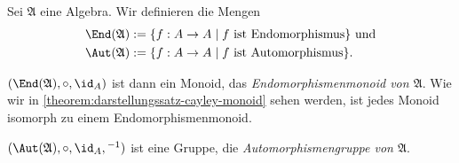 \begin{example}
    Sei $\mathfrak{A}$ eine Algebra. Wir definieren die Mengen \begin{align*}
        \End(\mathfrak{A}) &:= \{f: A \to A \mid f\text{ ist Endomorphismus}\} \text{ und} \\ \Aut(\mathfrak{A}) &:= \{f: A \to A \mid f\text{ ist Automorphismus}\}.
    \end{align*}

    $(\End(\mathfrak{A}), \circ, \id_A)$ ist dann ein Monoid, das \emph{Endomorphismenmonoid von $\mathfrak{A}$}. Wie wir in \cref{theorem:darstellungssatz-cayley-monoid} sehen werden, ist jedes Monoid isomorph zu einem Endomorphismenmonoid.
    
    $(\Aut(\mathfrak{A}), \circ, \id_A, {}^{-1})$ ist eine Gruppe, die \emph{Automorphismengruppe von $\mathfrak{A}$}.
\end{example}
